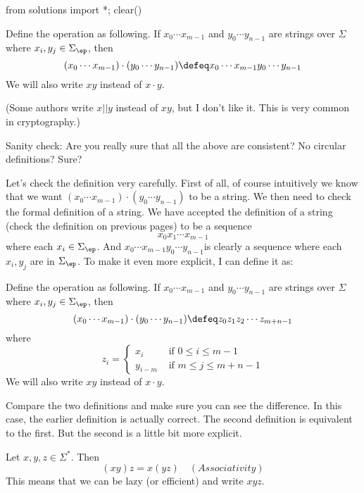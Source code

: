 \begin{python0}
from solutions import *; clear()
\end{python0}

\begin{defn}
  Define the  operation as following. If
  $x_0 \cdots x_{m-1}$ and $y_0 \cdots y_{n-1}$ are strings over $\Sigma$ where
  $x_i,y_j \in \Sigma_\ep$, then
  \[
  (x_0 \cdots x_{m-1}) \cdot (y_0 \cdots y_{n-1})
  \defeq x_0 \cdots x_{m-1} y_0 \cdots y_{n-1}
  \]
  We will also write $xy$ instead of $x\cdot y$.
\end{defn}

(Some authors write $x||y$ instead of $xy$, but I don't like it.
This is very common in cryptography.)

Sanity check: Are you really sure that all the above are
consistent? No circular definitions? Sure?

Let's check the definition very carefully.
First of all, of course intuitively we know that we want 
$(x_0 \cdots x_{m-1}) \cdot (y_0 \cdots y_{n-1})$
to be a string.
We then need to check the formal definition of a string.
We have accepted the definition of a string (check the definition on previous pages) to be a sequence
\[
x_0 x_1 \cdots x_{m-1}
\]
where each $x_i \in \Sigma_\ep$.
And $x_0 \cdots x_{m-1} y_0 \cdots y_{n-1}$is clearly a sequence where each $x_i, y_j$ are in $\Sigma_\ep$.
To make it even more explicit, I can define it as:

\begin{defn}
  Define the  operation as following. If
  $x_0 \cdots x_{m-1}$ and $y_0 \cdots y_{n-1}$ are strings over $\Sigma$ where
  $x_i,y_j \in \Sigma_\ep$, then
  \[
  (x_0 \cdots x_{m-1}) \cdot (y_0 \cdots y_{n-1})
  \defeq z_0 z_1 z_2 \cdots z_{m + n - 1}
  \]
  where
  \[
  z_i =
  \begin{cases}
    x_i & \text{ if $0 \leq i \leq m - 1$} \\
    y_{i - m} & \text{ if $m \leq j \leq m + n - 1$}
  \end{cases}
  \]
  We will also write $xy$ instead of $x\cdot y$.
\end{defn}

Compare the two definitions and make sure you can see the difference.
In this case, the earlier definition is actually correct.
The second definition is equivalent to the first.
But the second is a little bit more explicit.


\newpage
\begin{prop}
Let $x,y,z\in \Sigma^*$. Then
\[ (xy) z = x(yz) \quad (Associativity) \]
This means that we can be lazy (or efficient) and write $xyz$.
\end{prop}


